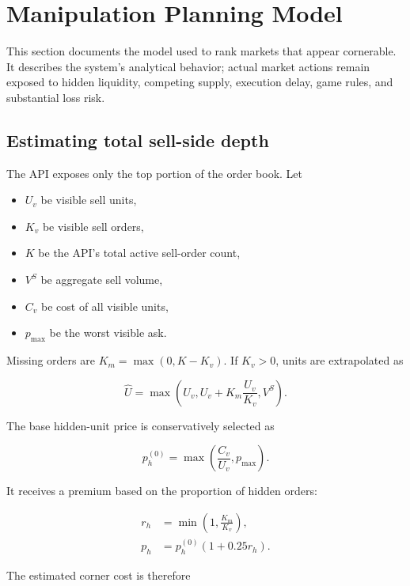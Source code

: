 \documentclass[11pt,a4paper]{article}
\begin{document}
\section{Manipulation Planning Model}

This section documents the model used to rank markets that appear cornerable. It describes
the system's analytical behavior; actual market actions remain exposed to hidden liquidity,
competing supply, execution delay, game rules, and substantial loss risk.

\subsection{Estimating total sell-side depth}

The API exposes only the top portion of the order book. Let

\begin{itemize}
  \item $U_v$ be visible sell units,
  \item $K_v$ be visible sell orders,
  \item $K$ be the API's total active sell-order count,
  \item $V^S$ be aggregate sell volume,
  \item $C_v$ be cost of all visible units,
  \item $p_{\max}$ be the worst visible ask.
\end{itemize}

Missing orders are $K_m=\max(0,K-K_v)$. If $K_v>0$, units are extrapolated as

\begin{equation}
\widehat U=\max\left(U_v,
U_v+K_m\frac{U_v}{K_v},
V^S\right).
\end{equation}

The base hidden-unit price is conservatively selected as

\begin{equation}
p_h^{(0)}=\max\left(\frac{C_v}{U_v},p_{\max}\right).
\end{equation}

It receives a premium based on the proportion of hidden orders:

\begin{align}
r_h&=\min\left(1,\frac{K_m}{K_v}\right),\\
p_h&=p_h^{(0)}(1+0.25r_h).
\end{align}

The estimated corner cost is therefore
\end{document}
